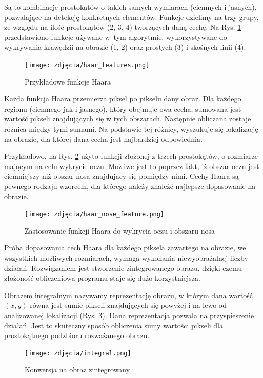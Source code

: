 Są to kombinacje prostokątów  o takich samych wymiarach (ciemnych i jasnych), pozwalające na detekcję konkretnych elementów. Funkcje dzielimy na trzy grupy, ze względu na ilość prostokątów (2, 3, 4) tworzących daną cechę. Na Rys. \ref{fig:haarFeatures} przedstawiono funkcje używane w~tym algorytmie, wykorzystywane do wykrywania krawędzii na obrazie (1, 2) oraz prostych (3) i skośnych linii (4).

\begin{figure}[h]
	\centering
	\texttt{[image: zdjęcia/haar\_features.png]}
	\caption{Przykładowe funkcje Haara \cite{haarFeautures}} 
	\label{fig:haarFeatures}
\end{figure}

Każda funkcja Haara przemierza piksel po pikselu dany obraz. Dla każdego regionu (ciemnego jak i jasnego), który obejmuje owa cecha, sumowana jest wartość pikseli znajdujących się w tych obszarach. Następnie obliczana zostaje różnica między tymi sumami. Na podstawie tej różnicy, wyszukuje się lokalizację na obrazie, dla której dana cecha jest najbardziej odpowiednia.

Przykładowo, na Rys. \ref{fig:haarNose} użyto funkcji złożonej z trzech prostokątów, o rozmiarze mającym na celu wykrycie oczu. Możliwe jest to poprzez fakt, iż obszar oczu jest ciemniejszy niż obszar nosa znajdujacy się pomiędzy nimi. Cechy Haara są pewnego rodzaju wzorcem, dla którego należy znaleźć najlepsze dopasowanie na obrazie.

\begin{figure}[h]
	\centering
	\texttt{[image: zdjęcia/haar\_nose\_feature.png]}
	\caption{Zastosowanie funkcji Haara do wykrycia oczu i obszaru nosa \cite{haar}} 
	\label{fig:haarNose}
\end{figure}

Próba dopasowania cech Haara dla każdego piksela zawartego na obrazie, we wszystkich możliwych rozmiarach, wymaga wykonania niewyobrażalnej liczby działań. Rozwiązaniem jest stworzenie zintegrowanego obrazu, dzięki czemu złożoność obliczeniowa programu staje się dużo korzystniejsza.

Obrazem integralnym nazywamy reprezentację obrazu, w którym dana wartość $(x, y)$ równa jest sumie pikseli znajdujących się powyżej i na lewo od analizowanej lokalizacji (Rys. \ref{fig:integralImage}). Dana reprezentacja pozwala na przyspieszenie działań. Jest to skuteczny sposób obliczenia sumy wartości pikseli dla prostokątnego podzbioru rozważanego obrazu.

 \begin{figure}[h]
	\centering
	\texttt{[image: zdjęcia/integral.png]}
	\caption{Konwersja na obraz zintegrowany \cite{haarCascade}} 
	\label{fig:integralImage}
\end{figure}

